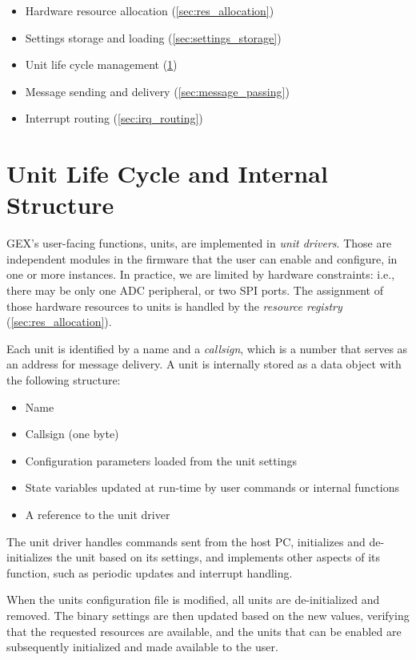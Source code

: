 \begin{itemize}
	\item Hardware resource allocation (\cref{sec:res_allocation})
	\item Settings storage and loading (\cref{sec:settings_storage})
	\item Unit life cycle management (\cref{sec:units_function})
	\item Message sending and delivery (\cref{sec:message_passing})
	\item Interrupt routing (\cref{sec:irq_routing})
\end{itemize}

\section{Unit Life Cycle and Internal Structure} \label{sec:units_function}

GEX's user-facing functions, units, are implemented in \textit{unit drivers}. Those are independent modules in the firmware that the user can enable and configure, in one or more instances. In practice, we are limited by hardware constraints: i.e., there may be only one \gls{ADC} peripheral, or two \gls{SPI} ports. The assignment of those hardware resources to units is handled by the \textit{resource registry} (\cref{sec:res_allocation}).



Each unit is identified by a name and a \textit{callsign}, which is a number that serves as an address for message delivery. A unit is internally stored as a data object with the following structure:

\begin{itemize}[itemsep=0pt]
	\item Name
	\item Callsign (one byte)
	\item Configuration parameters loaded from the unit settings
	\item State variables updated at run-time by user commands or internal functions
	\item A reference to the unit driver
\end{itemize}

The unit driver handles commands sent from the host \gls{PC}, initializes and de-initializes the unit based on its settings, and implements other aspects of its function, such as periodic updates and interrupt handling. 

When the units configuration file is modified, all units are de-initialized and removed. The binary settings are then updated based on the new values, verifying that the requested resources are available, and the units that can be enabled are subsequently initialized and made available to the user.


